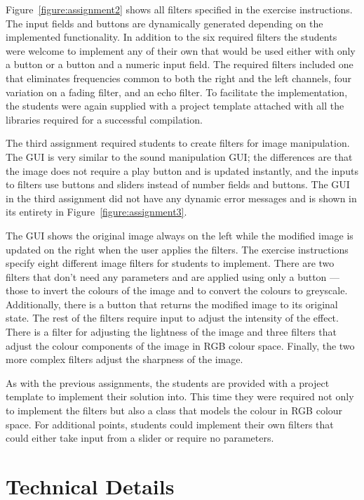 Figure~\ref{figure:assignment2} shows all filters specified in the exercise instructions. The input fields and buttons are dynamically generated depending on the implemented functionality. In addition to the six required filters the students were welcome to implement any of their own that would be used either with only a button or a button and a numeric input field. The required filters included one that eliminates frequencies common to both the right and the left channels, four variation on a fading filter, and an echo filter. To facilitate the implementation, the students were again supplied with a project template attached with all the libraries required for a successful compilation.

The third assignment required students to create filters for image manipulation. The GUI is very similar to the sound manipulation GUI; the differences are that the image does not require a play button and is updated instantly, and the inputs to filters use buttons and sliders instead of number fields and buttons. The GUI in the third assignment did not have any dynamic error messages and is shown in its entirety in Figure~\ref{figure:assignment3}.

The GUI shows the original image always on the left while the modified image is updated on the right when the user applies the filters. The exercise instructions specify eight different image filters for students to implement. There are two filters that don't need any parameters and are applied using only a button --- those to invert the colours of the image and to convert the colours to greyscale. Additionally, there is a button that returns the modified image to its original state. The rest of the filters require input to adjust the intensity of the effect. There is a filter for adjusting the lightness of the image and three filters that adjust the colour components of the image in RGB colour space. Finally, the two more complex filters adjust the sharpness of the image.

As with the previous assignments, the students are provided with a project template to implement their solution into. This time they were required not only to implement the filters but also a class that models the colour in RGB colour space. For additional points, students could implement their own filters that could either take input from a slider or require no parameters.


\section{Technical Details}
\label{section:technical}

